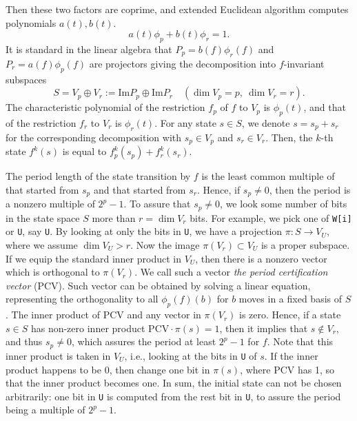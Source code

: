 \documentclass{svmult}
\begin{document}
%
%
Then these two factors are coprime, and extended Euclidean
algorithm computes polynomials $a(t),b(t)$.
\[
a(t)\phi_p + b(t)\phi_r = 1.
\]
It is standard in the linear algebra that 
$P_p = b(f)\phi_r(f)$ and $P_r=a(f)\phi_p(f)$
are projectors giving the decomposition into $f$-invariant subspaces
\[
S=V_p \oplus V_r:= \mathrm{Im}P_p \oplus \mathrm{Im}P_r \quad (\dim V_p=p, \ \dim V_r=r).
\]
The characteristic polynomial of 
the restriction $f_p$ of $f$ to $V_p$ is $\phi_p(t)$, and
that of the restriction $f_r$ to $V_r$ is $\phi_r(t)$. 
For any state $s \in S$, we denote $s=s_p+s_r$ for the corresponding
decomposition with $s_p \in V_p$ and $s_r \in V_r$.
Then, the $k$-th state $f^k(s)$ is equal to
$f_p^k(s_p) + f_r^k(s_r)$.


The period length of the state transition by $f$ 
is the least common multiple
of that started from $s_p$ and that started from $s_r$. Hence, 
if $s_p \neq 0$, then the period is a nonzero multiple of $2^p-1$.
To assure that $s_p \neq 0$, we look some number of bits in the state
space $S$ more than $r=\dim V_r$ bits. For example,
we pick one of \texttt{W[i]} or \texttt{U}, say \texttt{U}.
By looking at only the bits in \texttt{U}, 
we have a projection $\pi:S \to V_U$, where we assume $\dim V_U > r$.
Now the image $\pi(V_r) \subset V_U$ is a proper subspace.
If we equip the standard inner product in $V_U$, then 
there is a nonzero vector which is orthogonal to $\pi(V_r)$.
We call such a vector {\em the period certification vector} (PCV).
Such vector can be obtained by solving a linear equation,
representing the orthogonality to all $\phi_p(f)(b)$
for $b$ moves in a fixed basis of $S$.
The inner product of PCV and any vector in $\pi(V_r)$ is zero.
Hence, if a state $s \in S$ has
non-zero inner product $\mathrm{PCV}\cdot \pi(s)=1$, 
then it implies that $s \notin V_r$, and thus $s_p \neq 0$,
which assures the period at least $2^p-1$ for $f$.
Note that this inner product is taken in $V_U$, i.e., looking
at the bits in \texttt{U} of $s$. 
If the inner product happens to be 0, 
then change one bit in $\pi(s)$, where PCV has 1, 
so that the inner product becomes one.
In sum, the initial state can not be chosen arbitrarily:
one bit in \texttt{U} is computed from the rest bit in \texttt{U},
to assure the period being a multiple of $2^p-1$.
\end{document}
